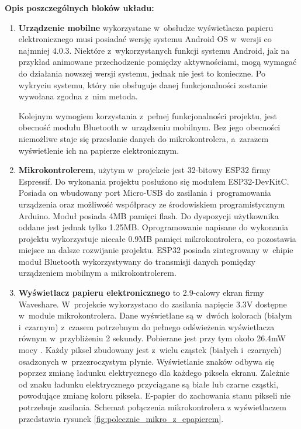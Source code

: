 \documentclass[a4paper,12pt, twoside]{article}
\begin{document}
        \begin{flushleft}
        \textbf{Opis poszczególnych bloków układu:}
        \end{flushleft}
        \begin{enumerate}
            \item \textbf{Urządzenie mobilne} wykorzystane w~obsłudze wyświetlacza papieru elektronicznego musi posiadać wersję systemu Android OS w~wersji co najmniej 4.0.3. Niektóre z~wykorzystanych funkcji systemu Android, jak na przykład animowane przechodzenie pomiędzy aktywnościami, mogą wymagać do działania nowszej wersji systemu, jednak nie jest to konieczne. Po wykryciu systemu, który nie obsługuje danej funkcjonalności zostanie wywołana zgodna z~nim metoda.
            
            Kolejnym wymogiem korzystania z~pełnej funkcjonalności projektu, jest obecność modułu Bluetooth w~urządzeniu mobilnym. Bez jego obecności niemożliwe staje się przesłanie danych do mikrokontrolera, a~zarazem wyświetlenie ich na papierze elektronicznym.
        
    	    \item \textbf{Mikrokontrolerem}, użytym w~projekcie jest 32-bitowy ESP32 firmy Espressif. Do wykonania projektu posłużono się modułem ESP32-DevKitC. Posiada on wbudowany port Micro-USB do zasilania i~programowania urządzenia oraz możliwość współpracy ze środowiskiem programistycznym Arduino. Moduł posiada 4MB pamięci flash\cite{flash}. Do dyspozycji użytkownika oddane jest jednak tylko 1.25MB. Oprogramowanie napisane do wykonania projektu wykorzystuje niecałe 0.9MB pamięci mikrokontrolera, co pozostawia miejsce na dalsze rozwijanie projektu. ESP32 posiada zintegrowany w~chipie moduł Bluetooth wykorzystywany do transmisji danych pomiędzy urządzeniem mobilnym a mikrokontrolerem.
    
    
            \item \textbf{Wyświetlacz papieru elektronicznego} to 2.9-calowy ekran firmy Waveshare. W~projekcie wykorzystano do zasilania napięcie 3.3V dostępne w~module mikrokontrolera. Dane wyświetlane są w~dwóch kolorach (białym i~czarnym) z~czasem potrzebnym do pełnego odświeżenia wyświetlacza równym w~przybliżeniu 2 sekundy. Pobierane jest przy tym około 26.4mW mocy \cite{waveshare}. Każdy piksel zbudowany jest z~wielu cząstek (białych i~czarnych) osadzonych w~przezroczystym płynie. Wyświetlanie znaków odbywa się poprzez zmianę ładunku elektrycznego dla każdego piksela ekranu. Zależnie od znaku ładunku elektrycznego przyciągane są białe lub czarne cząstki, powodujące zmianę koloru piksela. E-papier do zachowania stanu pikseli nie potrzebuje zasilania. Schemat połączenia mikrokontrolera z wyświetlaczem przedstawia rysunek \ref{fig:polecznie_mikro_z_epapierem}.
            


\end{enumerate}
\end{document}

